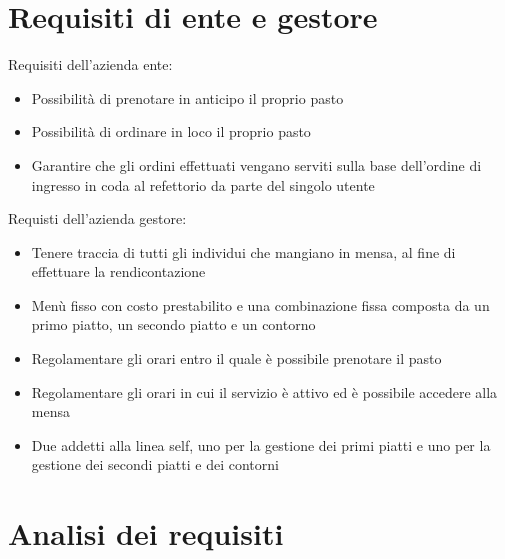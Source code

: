 \documentclass[a4paper, titlepage, 12pt, openright, twoside]{book}
\begin{document}
\section{Requisiti di ente e gestore}

Requisiti dell'azienda ente:
\begin{itemize}
	\item Possibilità di prenotare in anticipo il proprio pasto
	\item Possibilità di ordinare in loco il proprio pasto
	\item Garantire che gli ordini effettuati vengano serviti sulla base dell'ordine di ingresso in coda al refettorio da parte del singolo utente
\end{itemize}

Requisti dell'azienda gestore:
\begin{itemize}
	\item Tenere traccia di tutti gli individui che mangiano in mensa, al fine di effettuare la rendicontazione
	\item Menù fisso con costo prestabilito e una combinazione fissa composta da un primo piatto, un secondo piatto e un contorno
	\item Regolamentare gli orari entro il quale è possibile prenotare il pasto
	\item Regolamentare gli orari in cui il servizio è attivo ed è possibile accedere alla mensa
	\item Due addetti alla linea self, uno per la gestione dei primi piatti e uno per la gestione dei secondi piatti e dei contorni
\end{itemize}

\section{Analisi dei requisiti}
\end{document}
